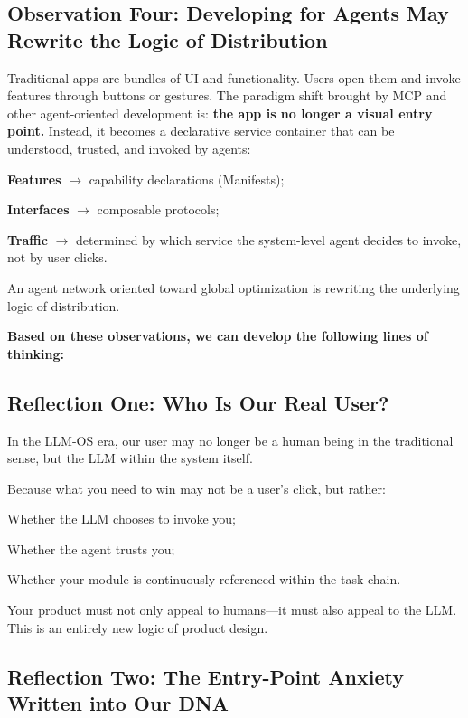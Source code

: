 \subsection{Observation Four: Developing for Agents May Rewrite the Logic of Distribution}

Traditional apps are bundles of UI and functionality. Users open them and invoke features through buttons or gestures.
The paradigm shift brought by MCP and other agent-oriented development is: \textbf{the app is no longer a visual entry point.}
Instead, it becomes a declarative service container that can be understood, trusted, and invoked by agents:

{\kaiti
\textbf{Features }$\to$ capability declarations (Manifests);

\textbf{Interfaces }$\to$ composable protocols;

\textbf{Traffic }$\to$ determined by which service the system-level agent decides to invoke, not by user clicks.
}

An agent network oriented toward global optimization is rewriting the underlying logic of distribution.

\newpage
\textbf{Based on these observations, we can develop the following lines of thinking:}
\subsection{Reflection One: Who Is Our Real User?}

\begin{importantbox}
In the LLM-OS era, our user may no longer be a human being in the traditional sense, but the LLM within the system itself.
\end{importantbox}

Because what you need to win may not be a user's click, but rather:

{\kaiti Whether the LLM chooses to invoke you;}

{\kaiti Whether the agent trusts you;}

{\kaiti Whether your module is continuously referenced within the task chain.}

Your product must not only appeal to humans---it must also appeal to the LLM. This is an entirely new logic of product design.


\subsection{Reflection Two: The Entry-Point Anxiety Written into Our DNA}

